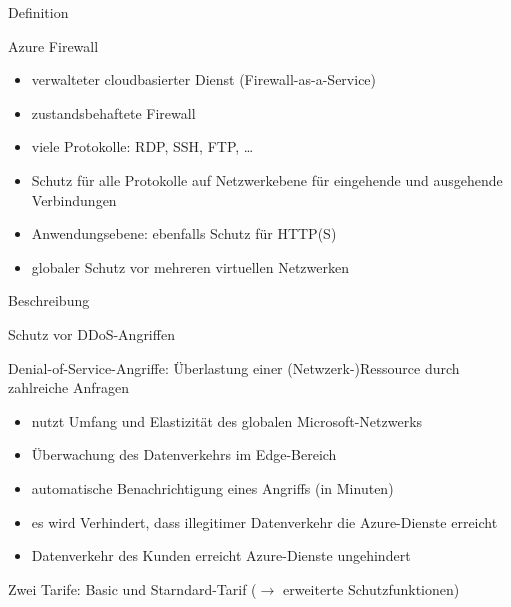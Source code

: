 \documentclass{scrartcl}
\newenvironment{flashcard}[2][]{%
    #1
    \vfill
    \centerline{\Large{#2}}
    \vfill
\newpage
}
{\newpage}
\begin{document}
    \begin{flashcard}[Definition]{Azure Firewall}
        \begin{itemize}
            \item verwalteter cloudbasierter Dienst (Firewall-as-a-Service)
            \item zustandsbehaftete Firewall
            \item viele Protokolle: RDP, SSH, FTP, \ldots
            \item Schutz für alle Protokolle auf Netzwerkebene für eingehende und ausgehende Verbindungen
            \item Anwendungsebene: ebenfalls Schutz für HTTP(S)
            \item globaler Schutz vor mehreren virtuellen Netzwerken
        \end{itemize}

    \end{flashcard}

    \begin{flashcard}[Beschreibung]{Schutz vor DDoS-Angriffen}
        Denial-of-Service-Angriffe: Überlastung einer (Netwzerk-)Ressource durch zahlreiche Anfragen
        \begin{itemize}
            \item nutzt Umfang und Elastizität des globalen Microsoft-Netzwerks
            \item Überwachung des Datenverkehrs im Edge-Bereich
            \item automatische Benachrichtigung eines Angriffs (in Minuten)
            \item es wird Verhindert, dass illegitimer Datenverkehr die Azure-Dienste erreicht
            \item Datenverkehr des Kunden erreicht Azure-Dienste ungehindert
        \end{itemize}
        Zwei Tarife: Basic und Starndard-Tarif ($\rightarrow$ erweiterte Schutzfunktionen)
    \end{flashcard}
\end{document}
